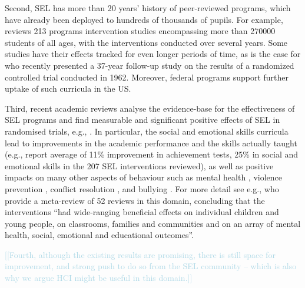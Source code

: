 \documentclass[prodmode,acmtochi]{acmsmall}
\newcommand{\todo}[1]{\textrm{\textrm{\textcolor{LightBlue}{[[#1]]} } } }
\newcommand{\rephrase}[1]{\textrm{\textrm{\textcolor{gray}{#1}}}}
\begin{document}
Second, SEL has more than 20 years' history of peer-reviewed programs, which have already been deployed to hundreds of thousands of pupils. For example,  reviews 213 programs intervention studies encompassing more than 270000 students of all ages, with the interventions conducted over several years. Some studies have their effects tracked for even longer periods of time, as is the case for  who recently presented a 37-year follow-up study on the results of a randomized controlled trial conducted in 1962. Moreover, federal programs support further uptake of such curricula in the US. 

Third, recent academic reviews analyse the evidence-base for the effectiveness of SEL programs and find measurable and significant positive effects of SEL in randomised trials, e.g., \cite{Durlak2011,Greenberg2010,Weare2011}. In particular, the social and emotional skills curricula lead to improvements in the academic performance and the skills actually taught (e.g.,   report average of 11\% improvement in achievement tests, 25\% in social and emotional skills in the 207 SEL interventions reviewed), as well as positive impacts on many other aspects of behaviour such as mental health \cite{Adi2007a}, violence prevention \cite{Mytton2006,Adi2007b}, conflict resolution \cite{Garrard2007},  and bullying \cite{Vreeman2007}. For more detail see e.g.,  who provide a meta-review of 52 reviews in this domain, concluding that the interventions ``had wide-ranging beneficial effects on individual children and young people, on classrooms, families and communities and on an array of mental health, social, emotional and educational outcomes''.

\todo{Fourth, although the existing results are promising, there is still space for improvement, and strong push to do so from the SEL community -- which is also why we argue HCI might be useful in this domain.}



\iffalse
\end{document}
